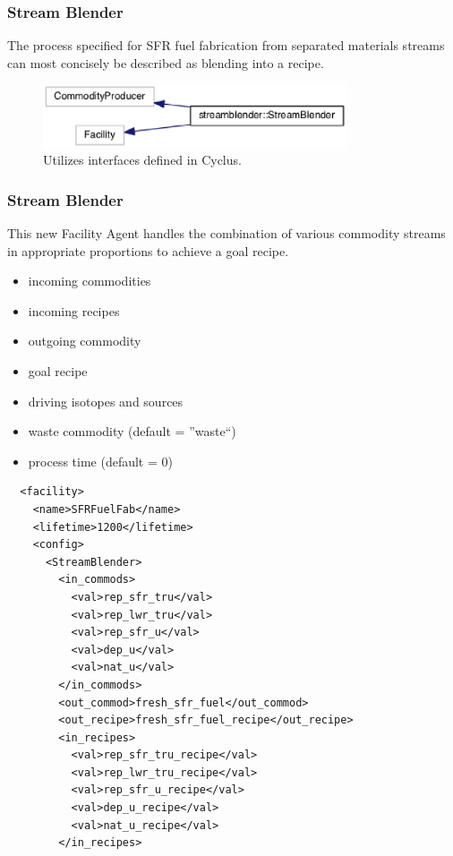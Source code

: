 \begin{frame}[fragile]
  \frametitle{Stream Blender} 
The process specified for SFR fuel fabrication from separated materials streams
can most concisely be described as blending into a recipe.
\begin{figure}[htbp!]
\begin{center}
\includegraphics[width=0.8\textwidth]{sb_inherit}
\end{center}
\caption{Utilizes interfaces defined in Cyclus.}
\label{fig:sb_inherit}
\end{figure}
\end{frame}
\begin{frame}[fragile]
  \frametitle{Stream Blender}
This new Facility Agent handles the combination of various 
commodity streams in appropriate proportions to achieve a goal recipe.  
\begin{itemize}
\item incoming commodities
\item incoming recipes
\item outgoing commodity
\item goal recipe
\item driving isotopes and sources
\item waste commodity (default = ''waste``)
\item process time (default = 0)
\end{itemize}
\end{frame}
\begin{frame}[fragile]
\footnotesize{
\begin{lstlisting}
  <facility>
    <name>SFRFuelFab</name>
    <lifetime>1200</lifetime>
    <config>
      <StreamBlender>
        <in_commods>
          <val>rep_sfr_tru</val>
          <val>rep_lwr_tru</val>
          <val>rep_sfr_u</val>
          <val>dep_u</val>
          <val>nat_u</val>
        </in_commods>
        <out_commod>fresh_sfr_fuel</out_commod>
        <out_recipe>fresh_sfr_fuel_recipe</out_recipe>
        <in_recipes>
          <val>rep_sfr_tru_recipe</val>
          <val>rep_lwr_tru_recipe</val>
          <val>rep_sfr_u_recipe</val>
          <val>dep_u_recipe</val>
          <val>nat_u_recipe</val>
        </in_recipes>
\end{lstlisting}
}
\end{frame}

